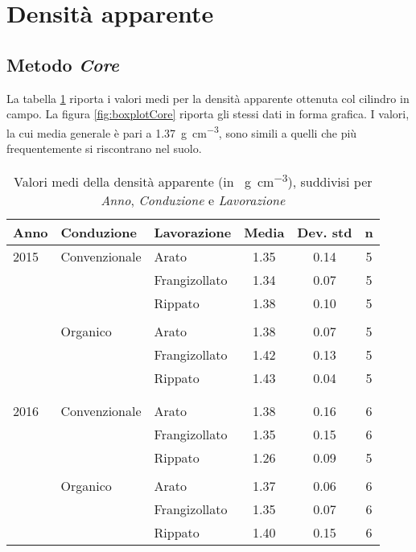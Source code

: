 \documentclass[a4paper]{article}
\begin{document}
%
\section{Densità apparente}


\subsection{Metodo \emph{Core}}

La tabella \ref{tab:summaryCore} riporta i valori medi per la densità
apparente ottenuta col cilindro in campo. La figura
\ref{fig:boxplotCore} riporta gli stessi dati in forma grafica. I
valori, la cui media generale \`e pari a
\SI{1.37}{\gram\per\cubic\centi\metre}, sono simili a quelli che pi\`u
frequentemente si riscontrano nel suolo.


\begin{table}[hb]
\centering
\caption{Valori medi della densità apparente (in \SI{}{\gram\per\cubic\centi\metre}),
suddivisi per \emph{Anno}, \emph{Conduzione} e \emph{Lavorazione} } 
\label{tab:summaryCore}
\begin{tabular}{lllccc}
  \hline
Anno & Conduzione & Lavorazione & Media & Dev. std & n \\ 
  \hline
2015 & Convenzionale & Arato & 1.35 & 0.14 &   5 \\ 
    &   & Frangizollato & 1.34 & 0.07 &   5 \\ 
    &   & Rippato & 1.38 & 0.10 &   5 \\ 
\\
    & Organico & Arato & 1.38 & 0.07 &   5 \\ 
    &   & Frangizollato & 1.42 & 0.13 &   5 \\ 
    &   & Rippato & 1.43 & 0.04 &   5 \\ 
\\
\\
  2016 & Convenzionale & Arato & 1.38 & 0.16 &   6 \\ 
    &   & Frangizollato & 1.35 & 0.15 &   6 \\ 
    &   & Rippato & 1.26 & 0.09 &   5 \\ 
\\
    & Organico & Arato & 1.37 & 0.06 &   6 \\ 
    &   & Frangizollato & 1.35 & 0.07 &   6 \\ 
    &   & Rippato & 1.40 & 0.15 &   6 \\ 
\hline
\end{tabular}
\end{table}\FloatBarrier
\end{document}
